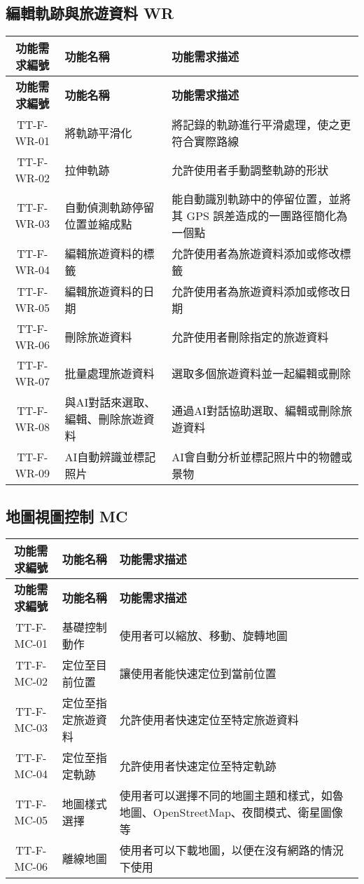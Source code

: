 \documentclass[12pt]{article}
\begin{document}
\subsection{編輯軌跡與旅遊資料 WR}

\begin{longtable}{|c|p{4.3cm}|p{8.9cm}|}
  \hline
  \textbf{功能需求編號} & \textbf{功能名稱} & \textbf{功能需求描述} \\
  \hline
  \endfirsthead
  \hline
  \textbf{功能需求編號} & \textbf{功能名稱} & \textbf{功能需求描述} \\
  \hline
  \endhead
  TT-F-WR-01 & 將軌跡平滑化 & 將記錄的軌跡進行平滑處理，使之更符合實際路線 \\
  \hline
  TT-F-WR-02 & 拉伸軌跡 & 允許使用者手動調整軌跡的形狀 \\
  \hline
  TT-F-WR-03 & 自動偵測軌跡停留位置並縮成點 & 能自動識別軌跡中的停留位置，並將其 GPS 誤差造成的一團路徑簡化為一個點 \\
  \hline
  TT-F-WR-04 & 編輯旅遊資料的標籤 & 允許使用者為旅遊資料添加或修改標籤 \\
  \hline
  TT-F-WR-05 & 編輯旅遊資料的日期 & 允許使用者為旅遊資料添加或修改日期 \\
  \hline
  TT-F-WR-06 & 刪除旅遊資料 & 允許使用者刪除指定的旅遊資料 \\
  \hline
  TT-F-WR-07 & 批量處理旅遊資料 & 選取多個旅遊資料並一起編輯或刪除 \\
  \hline
  TT-F-WR-08 & 與AI對話來選取、編輯、刪除旅遊資料 & 通過AI對話協助選取、編輯或刪除旅遊資料 \\
  \hline
  TT-F-WR-09 & AI自動辨識並標記照片 & AI會自動分析並標記照片中的物體或景物 \\
  \hline
\end{longtable}

\subsection{地圖視圖控制 MC}

\begin{longtable}{|c|p{4.3cm}|p{8.9cm}|}
  \hline
  \textbf{功能需求編號} & \textbf{功能名稱} & \textbf{功能需求描述} \\
  \hline
  \endfirsthead
  \hline
  \textbf{功能需求編號} & \textbf{功能名稱} & \textbf{功能需求描述} \\
  \hline
  \endhead
  TT-F-MC-01 & 基礎控制動作 & 使用者可以縮放、移動、旋轉地圖 \\
  \hline
  TT-F-MC-02 & 定位至目前位置 & 讓使用者能快速定位到當前位置 \\
  \hline
  TT-F-MC-03 & 定位至指定旅遊資料 & 允許使用者快速定位至特定旅遊資料 \\
  \hline
  TT-F-MC-04 & 定位至指定軌跡 & 允許使用者快速定位至特定軌跡 \\
  \hline
  TT-F-MC-05 & 地圖樣式選擇 & 使用者可以選擇不同的地圖主題和樣式，如魯地圖、OpenStreetMap、夜間模式、衛星圖像等 \\
  \hline
  TT-F-MC-06 & 離線地圖 & 使用者可以下載地圖，以便在沒有網路的情況下使用 \\
  \hline
\end{longtable}
\end{document}
